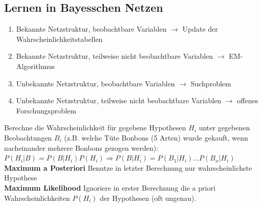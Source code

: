 \documentclass[12pt]{article}
\begin{document}
	\subsection{Lernen in Bayesschen Netzen}
	\begin{enumerate}
		\item Bekannte Netzstruktur, beobachtbare Variablen $\rightarrow$ Update der Wahrscheinlichkeitstabellen
		\item Bekannte Netzstruktur, teilweise nicht beobachtbare Variablen $\rightarrow$ EM-Algorithmus
		\item Unbekannte Netzstruktur, beobachtbare Variablen $\rightarrow$ Suchproblem
		\item Unbekannte Netzstruktur, teilweise nicht beobachtbare Variablen $\rightarrow$ offenes Forschungsproblem
	\end{enumerate}
	Berechne die Wahrscheinlichkeit für gegebene Hypothesen $H_i$ unter gegebenen Beobachtungen $B_i$ (z.B. welche Tüte Bonbons (5 Arten) wurde gekauft, wenn nacheinander mehrere Bonbons gezogen werden): $P(H_i|B) = P(B|H_i) P(H_i) \Rightarrow P(B|H_i) = P(B_1|H_i) ... P(B_n|H_i)$\\
	\textbf{Maximum a Posteriori} Benutze in letzter Berechnung nur wahrscheinlichste Hypothese\\
	\textbf{Maximum Likelihood} Ignoriere in erster Berechnung die a priori Wahrscheinlichkeiten $P(H_i)$ der Hypothesen (oft ungenau).
	
	
	
\end{document}
